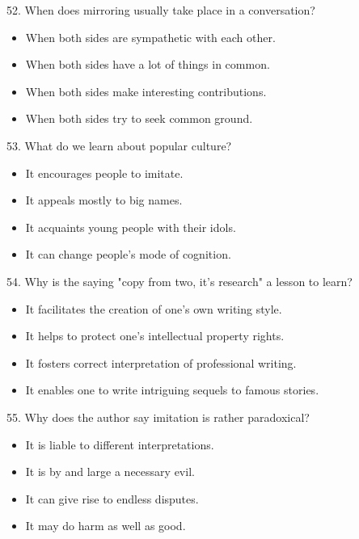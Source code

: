 \documentclass[UTF8,11pt]{ctexart}
\begin{document}
52. When does mirroring usually take place in a conversation?


\begin{itemize}[leftmargin=2em,itemsep=.2em,topsep=.4em]\item[A.] When both sides are sympathetic with each other.
\item[B.] When both sides have a lot of things in common.
\item[C.] When both sides make interesting contributions.
\item[D.] When both sides try to seek common ground.
\end{itemize}

53. What do we learn about popular culture?


\begin{itemize}[leftmargin=2em,itemsep=.2em,topsep=.4em]\item[A.] It encourages people to imitate.
\item[B.] It appeals mostly to big names.
\item[C.] It acquaints young people with their idols.
\item[D.] It can change people's mode of cognition.
\end{itemize}

54. Why is the saying "copy from two, it's research" a lesson to learn?


\begin{itemize}[leftmargin=2em,itemsep=.2em,topsep=.4em]\item[A.] It facilitates the creation of one's own writing style.
\item[B.] It helps to protect one's intellectual property rights.
\item[C.] It fosters correct interpretation of professional writing.
\item[D.] It enables one to write intriguing sequels to famous stories.
\end{itemize}

55. Why does the author say imitation is rather paradoxical?


\begin{itemize}[leftmargin=2em,itemsep=.2em,topsep=.4em]\item[A.] It is liable to different interpretations.
\item[B.] It is by and large a necessary evil.
\item[C.] It can give rise to endless disputes.
\item[D.] It may do harm as well as good.
\end{itemize}
\end{document}
